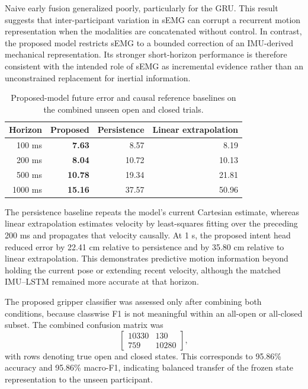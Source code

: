 Naive early fusion generalized poorly, particularly for the GRU. This result
suggests that inter-participant variation in sEMG can corrupt a recurrent
motion representation when the modalities are concatenated without control.
In contrast, the proposed model restricts sEMG to a bounded correction of an
IMU-derived mechanical representation. Its stronger short-horizon performance
is therefore consistent with the intended role of sEMG as incremental evidence
rather than an unconstrained replacement for inertial information.

\begin{table}[t]
 \centering
 \caption{Proposed-model future error and causal reference baselines on the
 combined unseen open and closed trials.}
 \label{tab:unseen-future-baselines}
 \small
 \begin{tabular}{rrrr}
  \hline
  Horizon & Proposed & Persistence & Linear extrapolation \\
  \hline
  100 ms  & \textbf{7.63} & 8.57 & 8.19 \\
  200 ms  & \textbf{8.04} & 10.72 & 10.13 \\
  500 ms  & \textbf{10.78} & 19.34 & 21.81 \\
  1000 ms & \textbf{15.16} & 37.57 & 50.96 \\
  \hline
 \end{tabular}
\end{table}

The persistence baseline repeats the model's current Cartesian estimate,
whereas linear extrapolation estimates velocity by least-squares fitting over
the preceding 200 ms and propagates that velocity causally. At 1 s, the
proposed intent head reduced error by 22.41 cm relative to persistence and by
35.80 cm relative to linear extrapolation. This demonstrates predictive motion
information beyond holding the current pose or extending recent velocity,
although the matched IMU--LSTM remained more accurate at that horizon.

The proposed gripper classifier was assessed only after combining both
conditions, because classwise F1 is not meaningful within an all-open or
all-closed subset. The combined confusion matrix was
\begin{equation}
 \begin{bmatrix}
  10330 & 130\\
  759 & 10280
 \end{bmatrix},
\end{equation}
with rows denoting true open and closed states. This corresponds to 95.86\%
accuracy and 95.86\% macro-F1, indicating balanced transfer of the frozen
state representation to the unseen participant.
